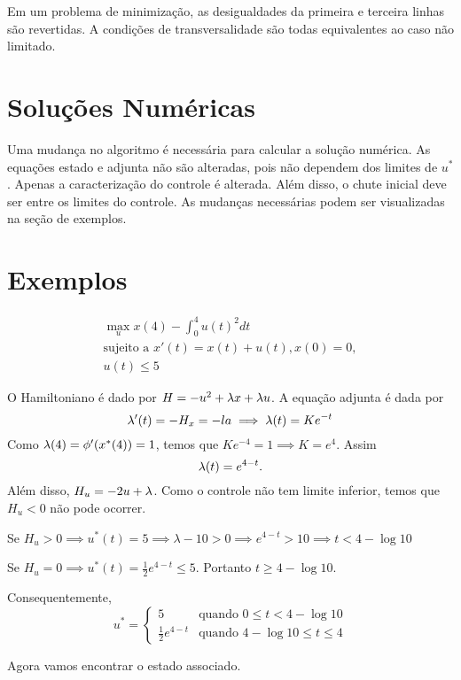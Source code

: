 Em um problema de minimização, as desigualdades da primeira e terceira linhas
são revertidas. A condições de transversalidade são todas equivalentes ao caso
não limitado. 

\section{Soluções Numéricas}

Uma mudança no algoritmo é necessária para calcular a solução numérica.  As
equações estado e adjunta não são alteradas, pois não dependem dos limites de
$u^*$. Apenas a caracterização do controle é alterada.  Além disso, o chute
inicial deve ser entre os limites do controle. As mudanças necessárias podem
ser visualizadas na seção de exemplos. 

\section{Exemplos}

\begin{example}
    \begin{gather*}
        \max_u x(4) - \int_0^4 u(t)^2 dt \\ 
        \text{sujeito a  }x'(t) = x(t) + u(t), x(0) = 0, \\
        u(t) \le 5
    \end{gather*}
\end{example}

O Hamiltoniano é dado por $H = -u^2 + \lambda x + \lambda u$. A equação adjunta é
dada por 
$$
\lambda '(t) = -H_x = - la \implies \lambda(t) = Ke^{-t}
$$
Como $\lambda(4) = \phi '(x^*(4)) = 1$, temos que $Ke^{-4} = 1 \implies K =
e^4$. Assim $$\lambda(t) = e^{4 - t}.$$
Além disso, $H_u = -2u + \lambda$. Como o controle não tem limite inferior,
temos que $H_u < 0$ não pode ocorrer. 

Se $H_u > 0 \implies u^{*}(t) = 5 \implies \lambda - 10 > 0 \implies e^{4
- t} > 10 \implies t < 4 - \log 10$

Se $H_u = 0 \implies u^*(t) = \frac{1}{2}e^{4-t} \le 5$. Portanto $t \ge 4
- \log 10$. 

Consequentemente, 
$$
u^* = \begin{cases}
    5 &\text{quando } 0 \le t < 4 -\log 10 \\
    \frac{1}{2}e^{4-t} &\text{quando } 4 - \log 10 \le t \le 4
\end{cases}
$$

Agora vamos encontrar o estado associado. 

